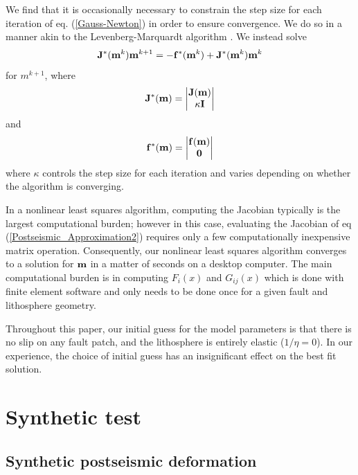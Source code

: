 \documentclass[fleqn,12pt]{article}
\begin{document}
We find that it is occasionally necessary to constrain the step size
for each iteration of eq. (\ref{Gauss-Newton}) in order to ensure
convergence.  We do so in a manner akin to the Levenberg-Marquardt
algorithm \citep[e.g.][]{A2013}.  We instead solve
\begin{equation}\label{Levenberg-Marquardt}
  \bold{J^*}(\bold{m}^k)\bold{m}^{k+1} = -\bold{f^*}(\bold{m}^k) + \bold{J^*}(\bold{m}^k)\bold{m}^k
\end{equation}
for $m^{k+1}$, where
\begin{equation}
  \bold{J^*}(\bold{m}) = 
      \begin{vmatrix}
      \bold{J}(\bold{m})\\
      \kappa\bold{I}
      \end{vmatrix}
\end{equation}
and
\begin{equation}
  \bold{f^*}(\bold{m}) = 
      \begin{vmatrix}
      \bold{f}(\bold{m})\\
      \bold{0}
      \end{vmatrix}
\end{equation}
where $\kappa$ controls the step size for each iteration and varies
depending on whether the algorithm is converging.  

In a nonlinear least squares algorithm, computing the Jacobian
typically is the largest computational burden; however in this case,
evaluating the Jacobian of eq (\ref{Postseismic_Approximation2})
requires only a few computationally inexpensive matrix operation.
Consequently, our nonlinear least squares algorithm converges to a
solution for $\bold{m}$ in a matter of seconds on a desktop computer.
The main computational burden is in computing $F_i(x)$ and $G_{ij}(x)$
which is done with finite element software and only needs to be done
once for a given fault and lithosphere geometry.

Throughout this paper, our initial guess for the model parameters is
that there is no slip on any fault patch, and the lithosphere is
entirely elastic ($1/\eta = 0$).  In our experience, the choice of
initial guess has an insignificant effect on the best fit
solution.

\section{Synthetic test}
\subsection{Synthetic postseismic deformation}
\end{document}
